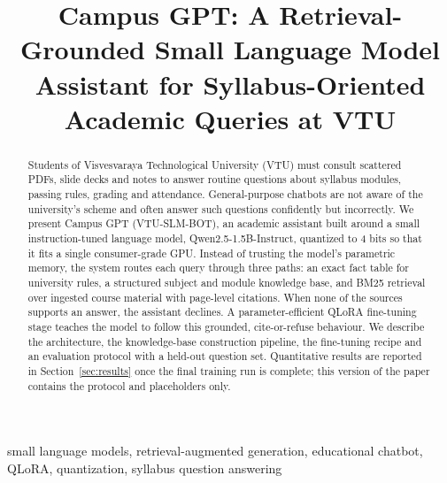 \documentclass[conference]{IEEEtran}
\begin{document}
\title{Campus GPT: A Retrieval-Grounded Small Language Model Assistant for Syllabus-Oriented Academic Queries at VTU}

\author{
\and
{}
}

\maketitle

\begin{abstract}
Students of Visvesvaraya Technological University (VTU) must consult scattered PDFs, slide decks and notes to answer routine questions about syllabus modules, passing rules, grading and attendance. General-purpose chatbots are not aware of the university's scheme and often answer such questions confidently but incorrectly. We present Campus GPT (VTU-SLM-BOT), an academic assistant built around a small instruction-tuned language model, Qwen2.5-1.5B-Instruct, quantized to 4 bits so that it fits a single consumer-grade GPU. Instead of trusting the model's parametric memory, the system routes each query through three paths: an exact fact table for university rules, a structured subject and module knowledge base, and BM25 retrieval over ingested course material with page-level citations. When none of the sources supports an answer, the assistant declines. A parameter-efficient QLoRA fine-tuning stage teaches the model to follow this grounded, cite-or-refuse behaviour. We describe the architecture, the knowledge-base construction pipeline, the fine-tuning recipe and an evaluation protocol with a held-out question set. Quantitative results are reported in Section~\ref{sec:results} once the final training run is complete; this version of the paper contains the protocol and placeholders only.
\end{abstract}

\begin{IEEEkeywords}
small language models, retrieval-augmented generation, educational chatbot, QLoRA, quantization, syllabus question answering
\end{IEEEkeywords}
\end{document}
